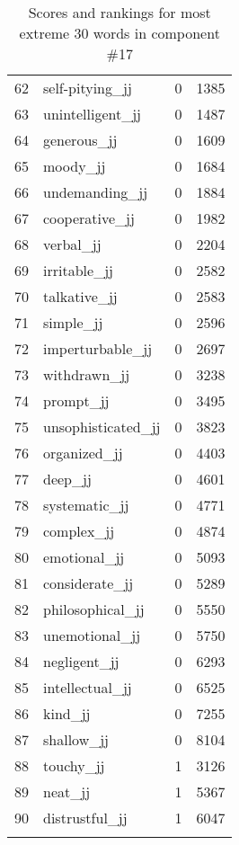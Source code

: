 \begin{longtable}[!htbp]{| rlr@{.}l |}
    62 & self-pitying\_jj & 0 & 1385 \\
    63 & unintelligent\_jj & 0 & 1487 \\
    64 & generous\_jj & 0 & 1609 \\
    65 & moody\_jj & 0 & 1684 \\
    66 & undemanding\_jj & 0 & 1884 \\
    67 & cooperative\_jj & 0 & 1982 \\
    68 & verbal\_jj & 0 & 2204 \\
    69 & irritable\_jj & 0 & 2582 \\
    70 & talkative\_jj & 0 & 2583 \\
    71 & simple\_jj & 0 & 2596 \\
    72 & imperturbable\_jj & 0 & 2697 \\
    73 & withdrawn\_jj & 0 & 3238 \\
    74 & prompt\_jj & 0 & 3495 \\
    75 & unsophisticated\_jj & 0 & 3823 \\
    76 & organized\_jj & 0 & 4403 \\
    77 & deep\_jj & 0 & 4601 \\
    78 & systematic\_jj & 0 & 4771 \\
    79 & complex\_jj & 0 & 4874 \\
    80 & emotional\_jj & 0 & 5093 \\
    81 & considerate\_jj & 0 & 5289 \\
    82 & philosophical\_jj & 0 & 5550 \\
    83 & unemotional\_jj & 0 & 5750 \\
    84 & negligent\_jj & 0 & 6293 \\
    85 & intellectual\_jj & 0 & 6525 \\
    86 & kind\_jj & 0 & 7255 \\
    87 & shallow\_jj & 0 & 8104 \\
    88 & touchy\_jj & 1 & 3126 \\
    89 & neat\_jj & 1 & 5367 \\
    90 & distrustful\_jj & 1 & 6047 \\
    \hline
    \caption{Scores and rankings for most extreme 30 words in component \#17} \\
\end{longtable}
